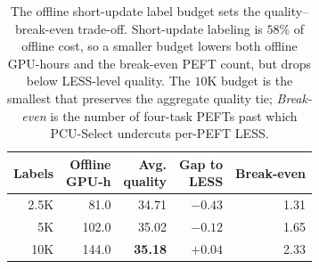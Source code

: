 \begin{table}[t]
\centering
\small
\setlength{\tabcolsep}{5pt}
\begin{tabular}{rrrrr}
\toprule
Labels & \shortstack{Offline\\GPU-h} & \shortstack{Avg.\\quality} & \shortstack{Gap to\\LESS} & Break-even \\
\midrule
2.5K & 81.0 & 34.71 & $-0.43$ & 1.31 \\
5K   & 102.0 & 35.02 & $-0.12$ & 1.65 \\
10K  & 144.0 & \textbf{35.18} & $+0.04$ & 2.33 \\
\bottomrule
\end{tabular}
\caption{The offline short-update label budget sets the quality--break-even
trade-off. Short-update labeling is $58\%$ of offline cost, so a smaller budget
lowers both offline GPU-hours and the break-even PEFT count, but drops below
LESS-level quality. The $10$K budget is the smallest that preserves the aggregate
quality tie; \emph{Break-even} is the number of four-task PEFTs past which
PCU-Select undercuts per-PEFT LESS.}
\label{tab:hf-budget}
\end{table}

